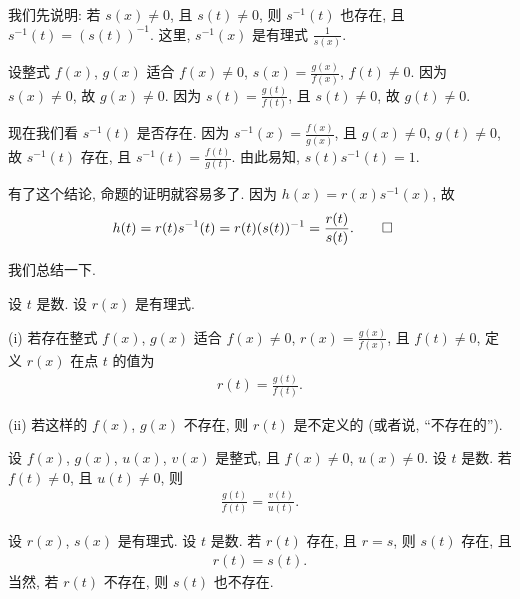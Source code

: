 \begin{pf}
    我们先说明: 若 $s(x) \neq 0$, 且 $s(t) \neq 0$, 则 $s^{-1} (t)$ 也存在, 且 $s^{-1} (t) = (s(t))^{-1}$. 这里, $s^{-1} (x)$ 是有理式 $\frac{1}{s(x)}$.

    设整式 $f(x)$, $g(x)$ 适合 $f(x) \neq 0$, $s(x) = \frac{g(x)}{f(x)}$, $f(t) \neq 0$. 因为 $s(x) \neq 0$, 故 $g(x) \neq 0$. 因为 $s(t) = \frac{g(t)}{f(t)}$, 且 $s(t) \neq 0$, 故 $g(t) \neq 0$.

    现在我们看 $s^{-1} (t)$ 是否存在. 因为 $s^{-1} (x) = \frac{f(x)}{g(x)}$, 且 $g(x) \neq 0$, $g(t) \neq 0$, 故 $s^{-1} (t)$ 存在, 且 $s^{-1} (t) = \frac{f(t)}{g(t)}$. 由此易知, $s(t) s^{-1} (t) = 1$.

    有了这个结论, 命题的证明就容易多了. 因为 $h(x) = r(x) s^{-1} (x)$, 故
    \begin{align*}
         & h(t) = r(t) s^{-1} (t) = r(t) (s(t))^{-1} = \frac{r(t)}{s(t)}. \qedhere
    \end{align*}
\end{pf}

我们总结一下.

\begin{definition}
    设 $t$ 是数. 设 $r(x)$ 是有理式.

    (i) 若存在整式 $f(x)$, $g(x)$ 适合 $f(x) \neq 0$, $r(x) = \frac{g(x)}{f(x)}$, 且 $f(t) \neq 0$, 定义 $r(x)$ 在点 $t$ 的值为
    \begin{align*}
        r(t) = \frac{g(t)}{f(t)}.
    \end{align*}

    (ii) 若这样的 $f(x)$, $g(x)$ 不存在, 则 $r(t)$ 是不定义的 (或者说, ``不存在的'').
\end{definition}

\begin{proposition}
    设 $f(x)$, $g(x)$, $u(x)$, $v(x)$ 是整式, 且 $f(x) \neq 0$, $u(x) \neq 0$. 设 $t$ 是数. 若 $f(t) \neq 0$, 且 $u(t) \neq 0$, 则
    \begin{align*}
        \frac{g(t)}{f(t)} = \frac{v(t)}{u(t)}.
    \end{align*}
\end{proposition}

\begin{proposition}
    设 $r(x)$, $s(x)$ 是有理式. 设 $t$ 是数. 若 $r(t)$ 存在, 且 $r = s$, 则 $s(t)$ 存在, 且
    \begin{align*}
        r(t) = s(t).
    \end{align*}
    当然, 若 $r(t)$ 不存在, 则 $s(t)$ 也不存在.
\end{proposition}

